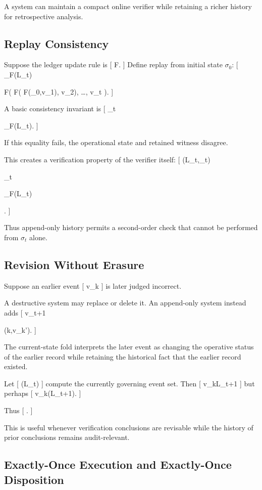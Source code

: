 \documentclass[11pt]{article}
\begin{document}
A system can maintain a compact online verifier while retaining a richer history for retrospective analysis.

\subsection{Replay Consistency}

Suppose the ledger update rule is
[
F.
]
Define replay from initial state $\sigma_0$:
[
_F(L_t)

F(
\cdots
F(
F(\sigma_0,v_1),
v_2),
\ldots,
v_t
).
]

A basic consistency invariant is
[
\sigma_t

_F(L_t).
]

If this equality fails, the operational state and retained witness disagree.

This creates a verification property of the verifier itself:
[
\Psi(L_t,\sigma_t)

{
\sigma_t

_F(L_t)
}.
]

Thus append-only history permits a second-order check that cannot be performed from $\sigma_t$ alone.

\subsection{Revision Without Erasure}

Suppose an earlier event
[
v_k
]
is later judged incorrect.

A destructive system may replace or delete it. An append-only system instead adds
[
v_{t+1}

(k,v_k').
]

The current-state fold interprets the later event as changing the operative status of the earlier record while retaining the historical fact that the earlier record existed.

Let
[
(L_t)
]
compute the currently governing event set. Then
[
v_k\in L_{t+1}
]
but perhaps
[
v_k\notin{}(L_{t+1}).
]

Thus
[
\not\Rightarrow
{}.
]

This is useful whenever verification conclusions are revisable while the history of prior conclusions remains audit-relevant.

\subsection{Exactly-Once Execution and Exactly-Once Disposition}
\end{document}
